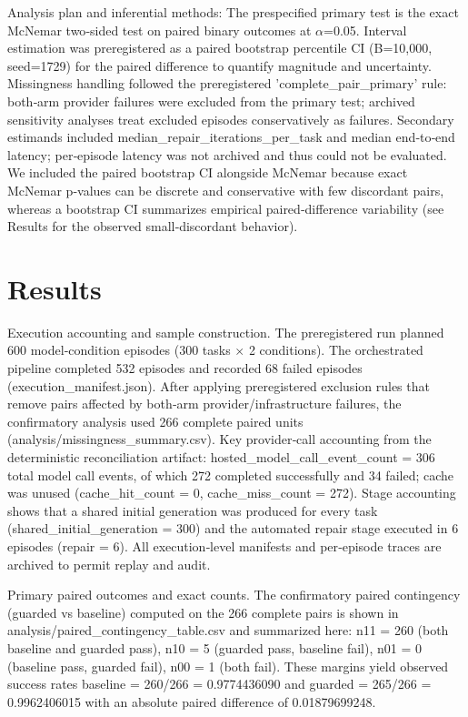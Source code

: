 \documentclass[conference]{IEEEtran}
\begin{document}
Analysis plan and inferential methods: The prespecified primary test is the exact McNemar two‑sided test on paired binary outcomes at \ensuremath{\alpha}=0.05. Interval estimation was preregistered as a paired bootstrap percentile CI (B=10,000, seed=1729) for the paired difference to quantify magnitude and uncertainty. Missingness handling followed the preregistered 'complete\_pair\_primary' rule: both‑arm provider failures were excluded from the primary test; archived sensitivity analyses treat excluded episodes conservatively as failures. Secondary estimands included median\_repair\_iterations\_per\_task and median end‑to‑end latency; per‑episode latency was not archived and thus could not be evaluated. We included the paired bootstrap CI alongside McNemar because exact McNemar p‑values can be discrete and conservative with few discordant pairs, whereas a bootstrap CI summarizes empirical paired‑difference variability (see Results for the observed small‑discordant behavior).

\section{Results}
Execution accounting and sample construction. The preregistered run planned 600 model‑condition episodes (300 tasks \ensuremath{\times} 2 conditions). The orchestrated pipeline completed 532 episodes and recorded 68 failed episodes (execution\_manifest.json). After applying preregistered exclusion rules that remove pairs affected by both‑arm provider/infrastructure failures, the confirmatory analysis used 266 complete paired units (analysis/missingness\_summary.csv). Key provider‑call accounting from the deterministic reconciliation artifact: hosted\_model\_call\_event\_count = 306 total model call events, of which 272 completed successfully and 34 failed; cache was unused (cache\_hit\_count = 0, cache\_miss\_count = 272). Stage accounting shows that a shared initial generation was produced for every task (shared\_initial\_generation = 300) and the automated repair stage executed in 6 episodes (repair = 6). All execution‑level manifests and per‑episode traces are archived to permit replay and audit.

Primary paired outcomes and exact counts. The confirmatory paired contingency (guarded vs baseline) computed on the 266 complete pairs is shown in analysis/paired\_contingency\_table.csv and summarized here: n11 = 260 (both baseline and guarded pass), n10 = 5 (guarded pass, baseline fail), n01 = 0 (baseline pass, guarded fail), n00 = 1 (both fail). These margins yield observed success rates baseline = 260/266 = 0.9774436090 and guarded = 265/266 = 0.9962406015 with an absolute paired difference of 0.01879699248.
\end{document}
